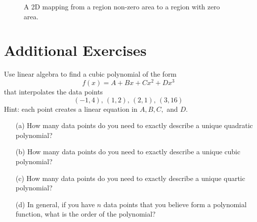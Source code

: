 \begin{figure}[ht!]
\begin{center}
    \end{center}
    \caption{A 2D mapping from a region non-zero area to a region with zero area.}
    \label{fig:determinant_vol_2}
\end{figure}



\newpage\section{Additional Exercises}

\begin{problem}
    Use linear algebra to find a cubic polynomial of the form 
    \[ f(x) = A + Bx + Cx^2 + Dx^3 \]
    that interpolates the data points
    \[ (-1,4), \, (1,2), \, (2,1), \, (3,16) \]
    Hint: each point creates a linear equation in $A, B, C,$ and $D$.  
\end{problem}

\begin{problem}
    \begin{enumerate}
        \item[(a)] How many data points do you need to exactly describe a unique quadratic
            polynomial?
        \item[(b)] How many data points do you need to exactly describe a unique cubic
            polynomial?
        \item[(c)] How many data points do you need to exactly describe a unique quartic
            polynomial?
        \item[(d)] In general, if you have $n$ data points that you believe form a
            polynomial function, what is the order of the polynomial?
    \end{enumerate}
\end{problem}

